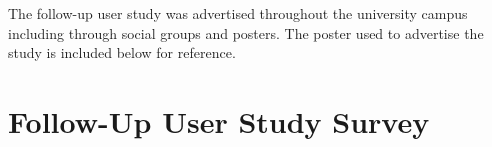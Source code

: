 The follow-up user study was advertised throughout the university campus including through social groups and posters. The poster used to advertise the study is included below for reference.

\begin{center}
\end{center}

\chapter{Follow-Up User Study Survey}
\label{appendix:follow-up-user-study-survey}

\clearpage

